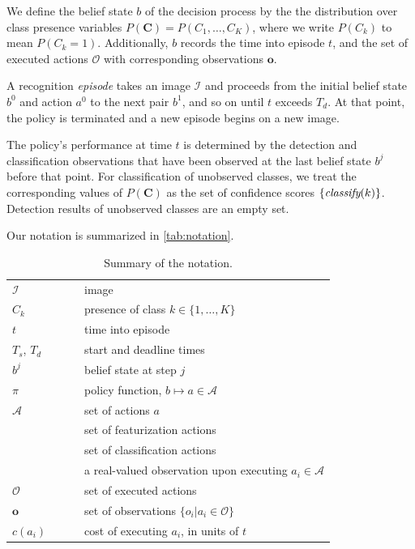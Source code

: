 We define the belief state $b$ of the decision process by the the distribution over class presence variables $P(\mathbf{C}) = P(C_1, \dots, C_K)$, where we write $P(C_k)$ to mean $P(C_k=1)$.
Additionally, $b$ records the time into episode $t$, and the set of executed actions $\mathcal{O}$ with corresponding observations $\mathbf{o}$.

A recognition \emph{episode} takes an image $\mathcal{I}$ and proceeds from the initial belief state $b^0$ and action $a^0$ to the next pair $b^1$, and so on until $t$ exceeds $T_d$.
At that point, the policy is terminated and a new episode begins on a new image.

The policy's performance at time $t$ is determined by the detection and classification observations that have been observed at the last belief state $b^j$ before that point.
For classification of unobserved classes, we treat the corresponding values of $P(\mathbf{C})$ as the set of confidence scores $\{\emph{classify}(k)\}$.
Detection results of unobserved classes are an empty set.


Our notation is summarized in \autoref{tab:notation}.

\begin{table}[h!]
\centering
\caption{Summary of the notation.}
\label{tab:notation}
\begin{tabular}{|l|l|}
  \hline
  $\mathcal{I}$ & image \\
  $C_k$         & presence of class $k \in \{1,\dots,K\}$ \\ 
  $t$           & time into episode \\ 
  $T_s$, $T_d$  & start and deadline times \\ 
  $b^j$         & belief state at step $j$ \\ 
  $\pi$         & policy function, $b \mapsto a \in \mathcal{A}$ \\
  $\mathcal{A}$ & set of actions $a$\\ 
  \comment{$\mathcal{F}$ & set of featurization actions \\}
  \comment{$\mathcal{L}$ & set of classification actions\\}
  $o_i$         & a real-valued observation upon executing $a_i \in \mathcal{A}$\\
  $\mathcal{O}$ & set of executed actions\\
  $\mathbf{o}$  & set of observations $\{o_i | a_i \in \mathcal{O}\}$\\
  $c(a_i)$        & cost of executing $a_i$, in units of $t$\\
  \hline
\end{tabular}\end{table}

